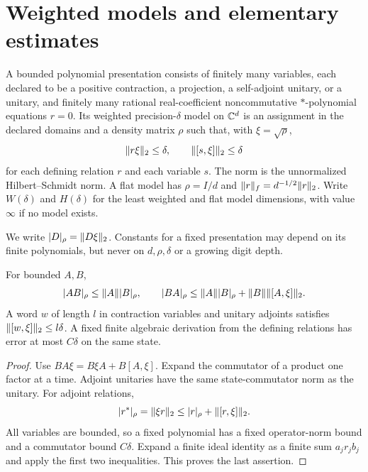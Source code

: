 \section{Weighted models and elementary estimates}\label{sec:prelim}
\begin{definition}\label{def:model}
A bounded polynomial presentation consists of finitely many variables, each declared to be a positive contraction, a projection, a self-adjoint unitary, or a unitary, and finitely many rational real-coefficient noncommutative $*$-polynomial equations $r=0$. Its weighted precision-$\delta$ model on $\mathbb C^d$ is an assignment in the declared domains and a density matrix $\rho$ such that, with $\xi=\sqrt\rho$,
\begin{equation}\label{eq:model}
 \lVert r\xi\rVert_2\le\delta,\qquad \lVert[s,\xi]\rVert_2\le\delta
\end{equation}
for each defining relation $r$ and each variable $s$. The norm is the unnormalized Hilbert--Schmidt norm. A flat model has $\rho=I/d$ and $\lVert r\rVert_f=d^{-1/2}\lVert r\rVert_2$. Write $W(\delta)$ and $H(\delta)$ for the least weighted and flat model dimensions, with value $\infty$ if no model exists.
\end{definition}

We write $|D|_\rho=\lVert D\xi\rVert_2$. Constants for a fixed presentation may depend on its finite polynomials, but never on $d,\rho,\delta$ or a growing digit depth.
\begin{lemma}\label{lem:transport}
For bounded $A,B$,
\[
 |AB|_\rho\le\lVert A\rVert|B|_\rho,\qquad
 |BA|_\rho\le\lVert A\rVert|B|_\rho+\lVert B\rVert\lVert[A,\xi]\rVert_2.
\]
A word $w$ of length $l$ in contraction variables and unitary adjoints satisfies $\lVert[w,\xi]\rVert_2\le l\delta$. A fixed finite algebraic derivation from the defining relations has error at most $C\delta$ on the same state.
\end{lemma}
\begin{proof}
Use $BA\xi=B\xi A+B[A,\xi]$. Expand the commutator of a product one factor at a time. Adjoint unitaries have the same state-commutator norm as the unitary. For adjoint relations,
\[
 |r^*|_\rho=\lVert\xi r\rVert_2\le |r|_\rho+\lVert[r,\xi]\rVert_2.
\]
All variables are bounded, so a fixed polynomial has a fixed operator-norm bound and a commutator bound $C\delta$. Expand a finite ideal identity as a finite sum $a_jr_jb_j$ and apply the first two inequalities. This proves the last assertion.
\end{proof}


